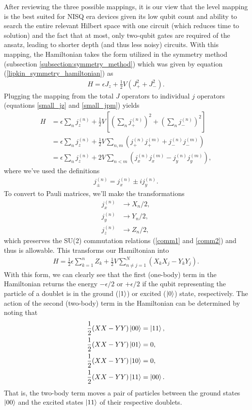 \documentclass[Dual]{msu-thesis}
\begin{document}
After reviewing the three possible mappings, it is our view that the level mapping \cite{ref:lipkin_naive} is the best suited for NISQ era devices given its low qubit count and ability to search the entire relevant Hilbert space with one circuit (which reduces time to solution) and the fact that at most, only two-qubit gates are required of the ansatz, leading to shorter depth (and thus less noisy) circuits. With this mapping, the Hamiltonian takes the form utilized in the symmetry method (subsection \ref{subsection:symmetry_method}) which was given by equation (\ref{lipkin_symmetry_hamiltonian}) as
\begin{align}
H
=
\epsilon J_z + \frac{1}{2}V(J^2_++J^2_-).
\end{align}
Plugging the mapping from the total $J$ operators to individual $j$ operators (equations \ref{small_jz} and \ref{small_jpm}) yields
\begin{align}
H
&=
\epsilon\sum_{n}j_z^{(n)} + \frac{1}{2}V\left[\left(\sum_nj^{(n)}_{+}\right)^2+\left(\sum_nj^{(n)}_{-}\right)^2\right]
\\
&=
\epsilon\sum_{n}j_z^{(n)} + \frac{1}{2}V\sum_{n,m}\left(j^{(n)}_+j^{(m)}_++j^{(n)}_-j^{(m)}_-\right)
\\
&=
\epsilon\sum_{n}j_z^{(n)} + 
2V\sum_{n<m}\left(j^{(n)}_xj^{(m)}_x-j^{(n)}_yj^{(m)}_y\right),
\end{align}
where we've used the definitions
\begin{align}
j_{\pm}^{(n)}=j_x^{(n)}\pm ij_y^{(n)}.
\end{align}
To convert to Pauli matrices, we'll make the transformations
\begin{align}
j_x^{(n)} &\to X_n/2,
\\
j_y^{(n)} &\to Y_n/2,
\\
j_z^{(n)} &\to Z_n/2,
\end{align}
which preserves the SU(2) commutation relations (\ref{comm1} and \ref{comm2}) and thus is allowable. This transforms our Hamiltonian into
\begin{align}
H=\frac{1}{2}\epsilon\sum_{k=1}^nZ_k+\frac{1}{2}V\sum_{n\neq j=1}^N(X_kX_j-Y_kY_j).
\end{align}
With this form, we can clearly see that the first (one-body) term in the Hamiltonian returns the energy $-\epsilon/2$ or $+\epsilon/2$ if the qubit representing the particle of a doublet is in the ground ($\ket{1}$) or excited ($\ket{0}$) state, respectively. The action of the second (two-body) term in the Hamiltonian can be determined by noting that
\begin{align}
\frac{1}{2}(XX-YY)\ket{00} &= \ket{11},
\\
\frac{1}{2}(XX-YY)\ket{01} &= 0,
\\
\frac{1}{2}(XX-YY)\ket{10} &= 0,
\\
\frac{1}{2}(XX-YY)\ket{11} &= \ket{00}.
\end{align}
That is, the two-body term moves a pair of particles between the ground states $\ket{00}$ and the excited states $\ket{11}$ of their respective doublets.  
\end{document}
